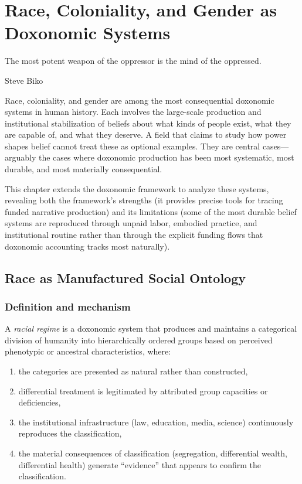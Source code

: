 \chapter{Race, Coloniality, and Gender as Doxonomic Systems}
\label{ch:race-coloniality-gender}

\epigraph{The most potent weapon of the oppressor is the mind of the oppressed.}{Steve Biko}

\noindent
Race, coloniality, and gender are among the most consequential doxonomic systems in human history.
Each involves the large-scale production and institutional stabilization of beliefs about what kinds of people exist, what they are capable of, and what they deserve.
A field that claims to study how power shapes belief cannot treat these as optional examples.
They are central cases---arguably the cases where doxonomic production has been most systematic, most durable, and most materially consequential.

This chapter extends the doxonomic framework to analyze these systems, revealing both the framework's strengths (it provides precise tools for tracing funded narrative production) and its limitations (some of the most durable belief systems are reproduced through unpaid labor, embodied practice, and institutional routine rather than through the explicit funding flows that doxonomic accounting tracks most naturally).

\section{Race as Manufactured Social Ontology}
\label{sec:ch24b-race}

\subsection{Definition and mechanism}

\begin{definition}
\label{def:racial-regime}
A \emph{racial regime} is a doxonomic system that produces and maintains a categorical division of humanity into hierarchically ordered groups based on perceived phenotypic or ancestral characteristics, where:
\begin{enumerate}[nosep]
  \item the categories are presented as natural rather than constructed,
  \item differential treatment is legitimated by attributed group capacities or deficiencies,
  \item the institutional infrastructure (law, education, media, science) continuously reproduces the classification,
  \item the material consequences of classification (segregation, differential wealth, differential health) generate ``evidence'' that appears to confirm the classification.
\end{enumerate}
\end{definition}


